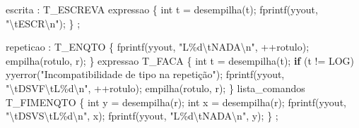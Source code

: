 \documentclass[
  brazilian,
  letterpaper,
]{book}
\newenvironment{Shaded}{\begin{snugshade}}{\end{snugshade}}
\newcommand{\CharTok}[1]{\textcolor[rgb]{0.13,0.47,0.30}{#1}}
\newcommand{\ControlFlowTok}[1]{\textcolor[rgb]{0.00,0.23,0.31}{\textbf{#1}}}
\newcommand{\DataTypeTok}[1]{\textcolor[rgb]{0.68,0.00,0.00}{#1}}
\newcommand{\NormalTok}[1]{\textcolor[rgb]{0.00,0.23,0.31}{#1}}
\newcommand{\OperatorTok}[1]{\textcolor[rgb]{0.37,0.37,0.37}{#1}}
\newcommand{\SpecialCharTok}[1]{\textcolor[rgb]{0.37,0.37,0.37}{#1}}
\newcommand{\StringTok}[1]{\textcolor[rgb]{0.13,0.47,0.30}{#1}}
\theoremstyle{plain}
\theoremstyle{definition}
\theoremstyle{remark}
\begin{document}
\begin{Shaded}
\begin{Highlighting}[]
\NormalTok{escrita}
    \OperatorTok{:}\NormalTok{ T\_ESCREVA expressao}
       \OperatorTok{\{}
        \DataTypeTok{int}\NormalTok{ t }\OperatorTok{=}\NormalTok{ desempilha}\OperatorTok{(}\CharTok{\textquotesingle{}t\textquotesingle{}}\OperatorTok{);} 
\NormalTok{        fprintf}\OperatorTok{(}\NormalTok{yyout}\OperatorTok{,} \StringTok{"}\SpecialCharTok{\textbackslash{}t}\StringTok{ESCR}\SpecialCharTok{\textbackslash{}n}\StringTok{"}\OperatorTok{);} 
       \OperatorTok{\}}
    \OperatorTok{;}

\NormalTok{repeticao}
    \OperatorTok{:}\NormalTok{ T\_ENQTO }
        \OperatorTok{\{} 
\NormalTok{            fprintf}\OperatorTok{(}\NormalTok{yyout}\OperatorTok{,} \StringTok{"L}\SpecialCharTok{\%d\textbackslash{}t}\StringTok{NADA}\SpecialCharTok{\textbackslash{}n}\StringTok{"}\OperatorTok{,} \OperatorTok{++}\NormalTok{rotulo}\OperatorTok{);}
\NormalTok{            empilha}\OperatorTok{(}\NormalTok{rotulo}\OperatorTok{,} \CharTok{\textquotesingle{}r\textquotesingle{}}\OperatorTok{);} 
        \OperatorTok{\}}
\NormalTok{      expressao }
\NormalTok{      T\_FACA }
        \OperatorTok{\{} 
            \DataTypeTok{int}\NormalTok{ t }\OperatorTok{=}\NormalTok{ desempilha}\OperatorTok{(}\CharTok{\textquotesingle{}t\textquotesingle{}}\OperatorTok{);}
            \ControlFlowTok{if} \OperatorTok{(}\NormalTok{t }\OperatorTok{!=}\NormalTok{ LOG}\OperatorTok{)}
\NormalTok{                yyerror}\OperatorTok{(}\StringTok{"Incompatibilidade de tipo na repetição"}\OperatorTok{);}
\NormalTok{            fprintf}\OperatorTok{(}\NormalTok{yyout}\OperatorTok{,} \StringTok{"}\SpecialCharTok{\textbackslash{}t}\StringTok{DSVF}\SpecialCharTok{\textbackslash{}t}\StringTok{L}\SpecialCharTok{\%d\textbackslash{}n}\StringTok{"}\OperatorTok{,} \OperatorTok{++}\NormalTok{rotulo}\OperatorTok{);}
\NormalTok{            empilha}\OperatorTok{(}\NormalTok{rotulo}\OperatorTok{,} \CharTok{\textquotesingle{}r\textquotesingle{}}\OperatorTok{);}
        \OperatorTok{\}}
\NormalTok{      lista\_comandos }
\NormalTok{      T\_FIMENQTO}
        \OperatorTok{\{} 
            \DataTypeTok{int}\NormalTok{ y }\OperatorTok{=}\NormalTok{ desempilha}\OperatorTok{(}\CharTok{\textquotesingle{}r\textquotesingle{}}\OperatorTok{);}
            \DataTypeTok{int}\NormalTok{ x }\OperatorTok{=}\NormalTok{ desempilha}\OperatorTok{(}\CharTok{\textquotesingle{}r\textquotesingle{}}\OperatorTok{);}
\NormalTok{            fprintf}\OperatorTok{(}\NormalTok{yyout}\OperatorTok{,} \StringTok{"}\SpecialCharTok{\textbackslash{}t}\StringTok{DSVS}\SpecialCharTok{\textbackslash{}t}\StringTok{L}\SpecialCharTok{\%d\textbackslash{}n}\StringTok{"}\OperatorTok{,}\NormalTok{ x}\OperatorTok{);}
\NormalTok{            fprintf}\OperatorTok{(}\NormalTok{yyout}\OperatorTok{,} \StringTok{"L}\SpecialCharTok{\%d\textbackslash{}t}\StringTok{NADA}\SpecialCharTok{\textbackslash{}n}\StringTok{"}\OperatorTok{,}\NormalTok{ y}\OperatorTok{);}
        \OperatorTok{\}}
    \OperatorTok{;}


\end{Highlighting}
\end{Shaded}
\end{document}
